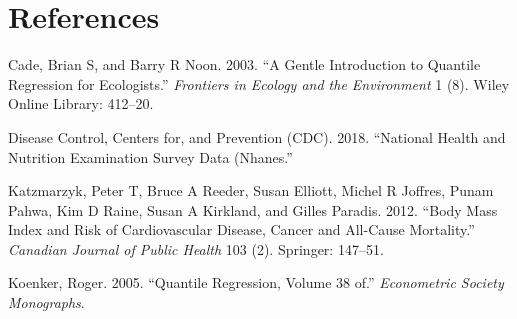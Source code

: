 \documentclass[]{article}
\begin{document}
\section*{References}\label{references}

\hypertarget{refs}{}
\hypertarget{ref-cade2003}{}
Cade, Brian S, and Barry R Noon. 2003. ``A Gentle Introduction to
Quantile Regression for Ecologists.'' \emph{Frontiers in Ecology and the
Environment} 1 (8). Wiley Online Library: 412--20.

\hypertarget{ref-NHANES}{}
Disease Control, Centers for, and Prevention (CDC). 2018. ``National
Health and Nutrition Examination Survey Data (Nhanes.''

\hypertarget{ref-katbody}{}
Katzmarzyk, Peter T, Bruce A Reeder, Susan Elliott, Michel R Joffres,
Punam Pahwa, Kim D Raine, Susan A Kirkland, and Gilles Paradis. 2012.
``Body Mass Index and Risk of Cardiovascular Disease, Cancer and
All-Cause Mortality.'' \emph{Canadian Journal of Public Health} 103 (2).
Springer: 147--51.

\hypertarget{ref-koenker2005}{}
Koenker, Roger. 2005. ``Quantile Regression, Volume 38 of.''
\emph{Econometric Society Monographs}.
\end{document}
